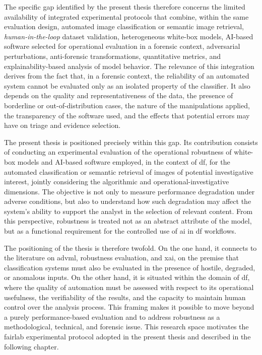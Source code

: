 The specific gap identified by the present thesis therefore concerns the limited
availability of integrated experimental protocols that combine, within the same
evaluation design, automated image classification or semantic image retrieval,
\textit{human-in-the-loop} dataset validation, heterogeneous white-box models,
AI-based software selected for operational evaluation in a forensic context,
adversarial perturbations, anti-forensic transformations, quantitative metrics,
and explainability-based analysis of model behavior. The relevance of this
integration derives from the fact that, in a forensic context, the reliability
of an automated system cannot be evaluated only as an isolated property of the
classifier. It also depends on the quality and representativeness of the data,
the presence of borderline or out-of-distribution cases, the nature of the
manipulations applied, the transparency of the software used, and the effects
that potential errors may have on triage and evidence selection.

The present thesis is positioned precisely within this gap. Its contribution
consists of conducting an experimental evaluation of the operational robustness
of white-box models and AI-based software employed, in the context of \gls{df}, for
the automated classification or semantic retrieval of images of potential
investigative interest, jointly considering the algorithmic and
operational-investigative dimensions. The objective is not only to measure
performance degradation under adverse conditions, but also to understand how
such degradation may affect the system's ability to support the analyst in the
selection of relevant content. From this perspective, robustness is treated not
as an abstract attribute of the model, but as a functional requirement for the
controlled use of \gls{ai} in \gls{df} workflows.

The positioning of the thesis is therefore twofold. On the one hand, it connects
to the literature on \gls{advml}, robustness evaluation, and \gls{xai}, on the
premise that classification systems must also be evaluated in the presence of
hostile, degraded, or anomalous inputs. On the other hand, it is situated within
the domain of \gls{df}, where the quality of automation must be assessed with
respect to its operational usefulness, the verifiability of the results, and
the capacity to maintain human control over the analysis process. This framing
makes it possible to move beyond a purely performance-based evaluation and to
address robustness as a methodological, technical, and forensic issue.
This research space motivates the \gls{fairlab} experimental protocol adopted
in the present thesis and described in the following chapter.
